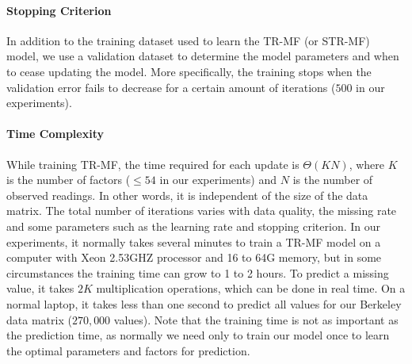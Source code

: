 
\paragraph*{Stopping Criterion}
In addition to the training dataset used to learn the TR-MF (or STR-MF) model, we use a validation 
dataset to determine the model parameters and when to cease updating the model. 
More specifically, the training stops when the validation error fails to decrease for a certain 
amount of iterations ($500$ in our experiments). 

\paragraph*{Time Complexity}
While training TR-MF, the time required for each update is $\Theta(KN)$, where $K$ is the number 
of factors ($\leq 54$ in our experiments) and $N$ is the number of observed readings.
In other words, it is independent of the size of the data matrix. 
The total number of iterations varies with data quality, the missing rate and some parameters such as the learning rate and stopping criterion.
In our experiments, it normally takes several minutes to train a TR-MF model on a computer with Xeon 2.53GHZ processor and 16 to 64G memory, but in some circumstances the training time can grow to 1 to 2 hours.
To predict a missing value, it takes $2K$ multiplication operations, which can be done in real time. 
On a normal laptop, it takes less than one second to predict all values for our Berkeley data matrix ($270,000$ values).
Note that the training time is not as important as the prediction time, as normally we need only to train our model once to learn the optimal parameters and factors for prediction.

